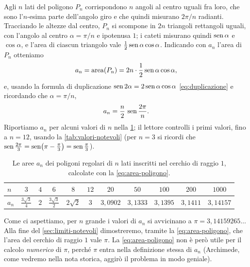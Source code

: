 Agli $n$ lati del poligono $P_{n}$ corrispondono $n$ angoli al centro uguali fra loro,
che sono l'$n$-esima parte dell'angolo giro e che quindi misurano $2\pi/n$ radianti.
Tracciando le altezze dal centro, $P_{n}$ si scompone in $2n$ triangoli rettangoli
uguali, con l'angolo al centro $\alpha=\pi/n$ e ipotenusa $1$; i cateti misurano quindi
$\operatorname{sen}\alpha$ e $\cos\alpha$, e l'area di ciascun triangolo vale
$\frac12\operatorname{sen}\alpha\cos\alpha$. Indicando con $a_{n}$ l'area di $P_{n}$ otteniamo
\begin{equation}\label{eq:area-poligono-1}
  a_{n}=\operatorname{area}(P_{n})=2n\cdot\frac12\operatorname{sen}\alpha\cos\alpha,
\end{equation}
e, usando la formula di duplicazione $\operatorname{sen}2\alpha=2\operatorname{sen}\alpha\cos\alpha$
\eqref{eq:duplicazione} e ricordando che $\alpha=\pi/n$,
\begin{equation}\label{eq:area-poligono}
  a_{n}=\frac n2\,\operatorname{sen}\frac{2\pi}{n}.
\end{equation}
Riportiamo $a_{n}$ per alcuni valori di $n$ nella \cref{tab:aree-poligoni}; il lettore
controlli i primi valori, fino a $n=12$, usando la \cref{tab:valori-notevoli} (per $n=3$
si ricordi che $\operatorname{sen}\frac{2\pi}3=\operatorname{sen}\bigl(\pi-\frac\pi3\bigr)=\operatorname{sen}\frac\pi3$).

\begin{table}[htb]
\centering
\renewcommand{\arraystretch}{1.5}
\footnotesize\setlength{\tabcolsep}{4pt}
\begin{tabular}{l*{10}{c}}
\toprule
$n$ & $3$ & $4$ & $6$ & $8$ & $12$ & $20$ & $50$ & $100$ & $200$ & $1000$\\
\midrule
$a_{n}$ & $\tfrac{3\sqrt3}{4}$ & $2$ & $\tfrac{3\sqrt3}{2}$ & $2\sqrt2$ & $3$ & $3{,}0902$ &
$3{,}1333$ & $3{,}1395$ & $3{,}1411$ & $3{,}14157$\\
\bottomrule
\end{tabular}
\caption{Le aree $a_{n}$ dei poligoni regolari di $n$ lati inscritti nel cerchio di
raggio $1$, calcolate con la \eqref{eq:area-poligono}.}
\label{tab:aree-poligoni}
\end{table}

Come ci aspettiamo, per $n$ grande i valori di $a_{n}$ si avvicinano a
$\pi=3{,}14159265\ldots$ Alla fine del \cref{sec:limiti-notevoli} dimostreremo, tramite
la \eqref{eq:area-poligono}, che l'area del cerchio di raggio $1$ vale $\pi$. La
\eqref{eq:area-poligono} non è però utile per il calcolo \emph{numerico} di $\pi$, perché
$\pi$ entra nella definizione stessa di $a_{n}$ (Archimede, come vedremo nella nota
storica, aggirò il problema in modo geniale).


